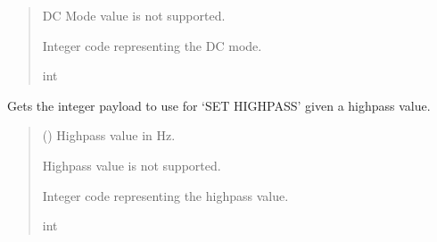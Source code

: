 \documentclass[letterpaper,10pt,english]{sphinxmanual}
\begin{document}
\begin{fulllineitems}
\begin{fulllineitems}
\begin{quote}
\begin{description}
\sphinxAtStartPar
{} \textendash{} DC Mode value is not supported.

\sphinxAtStartPar
Integer code representing the DC mode.

\sphinxAtStartPar
int

\end{description}\end{quote}

\end{fulllineitems}


\begin{fulllineitems}
\label{\detokenize{Setup.SetupOneDevice:Setup.SetupOneDevice.Setup_8401HR.Setup8401HR._CodeHighpass}}
\pysigstartsignatures
{}
\pysigstopsignatures
\sphinxAtStartPar
Gets the integer payload to use for ‘SET HIGHPASS’ given a highpass value.
\begin{quote}\begin{description}
\sphinxAtStartPar
{} () \textendash{} Highpass value in Hz.

\sphinxAtStartPar
{} \textendash{} High\sphinxhyphen{}pass value is not supported.

\sphinxAtStartPar
Integer code representing the highpass value.

\sphinxAtStartPar
int

\end{description}\end{quote}

\end{fulllineitems}



\end{fulllineitems}
\end{document}
